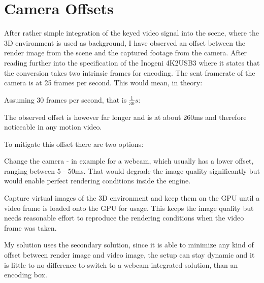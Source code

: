 %
\section{Camera Offsets}

After rather simple integration of the keyed video signal into the scene, where 
the 3D environment is used as background, I have observed an offset between the 
render image from the scene and the captured footage from the camera. After 
reading further into the specification of the Inogeni 4K2USB3 where it states 
that the conversion takes two intrinsic frames for encoding. The sent framerate 
of the camera is at 25 frames per second. This would mean, in theory:


Assuming 30 frames per second, that is $\frac{1}{30}s$:



The observed offset is however far longer and is at about 260ms and therefore 
noticeable in any motion video.


To mitigate this offset there are two options:

\begin{my_list}
	\item Change the camera - in example for a webcam, which usually has a 
	lower offset, ranging between 5 - 50ms. That would degrade the image 
	quality significantly but would enable perfect rendering conditions inside 
	the engine.
	\item Capture virtual images of the 3D environment and keep them on the GPU 
	until a video frame is loaded onto the GPU for usage. This keeps the image 
	quality but needs reasonable effort to reproduce the rendering conditions 
	when the video frame was taken. 
\end{my_list}

My solution uses the secondary solution, since it is able to minimize any kind 
of offset between render image and video image, the setup can stay dynamic and 
it is little to no difference to switch to a webcam-integrated solution, than 
an encoding box.

